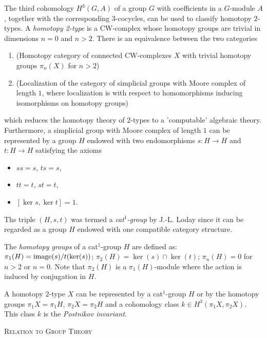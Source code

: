 \documentclass[a4paper,11pt]{report}
\begin{document}
{{ The third cohomology $H^3(G,A)$ of a group $G$ with coefficients in a $G$-module $A$, together with the corresponding $3$-cocycles, can be used to classify homotopy $2$-types. A \emph{homotopy 2-type} is a CW-complex whose homotopy groups are trivial in dimensions $n=0$ and $n>2$. There is an equivalence between the two categories 
\begin{enumerate}
\item  (Homotopy category of connected CW-complexes $X$ with trivial homotopy groups $\pi_n(X)$ for $n>2$) 
\item  (Localization of the category of simplicial groups with Moore complex of
length $1$, where localization is with respect to homomorphisms inducing isomorphisms on
homotopy groups) 
\end{enumerate}
 which reduces the homotopy theory of $2$-types to a 'computable' algebraic theory. Furthermore, a simplicial group
with Moore complex of length $1$ can be represented by a group $H$ endowed with two endomorphisms $s\colon H\rightarrow H$ and $t\colon H\rightarrow H$ satisfying the axioms 
\begin{itemize}
\item $ss=s$, $ts=s$,
\item $tt=t$, $st=t$,
\item  $[\ker s, \ker t] = 1$.
\end{itemize}
 Ths triple $(H,s,t)$ was termed a \emph{cat$^1$-group} by J.-L. Loday since it can be regarded as a group $H$ endowed with one compatible category structure. 

The \emph{homotopy groups} of a cat$^1$-group $H$ are defined as: $\pi_1(H) = {\rm image}(s)/t(\ker(s))$; $\pi_2(H)=\ker(s) \cap \ker(t)$; $\pi_n(H)=0$ for $n> 2$ or $n=0$. Note that $\pi_2(H)$ is a $\pi_1(H)$-module where the action is induced by conjugation in $H$. 

A homotopy $2$-type $X$ can be represented by a cat$^1$-group $H$ or by the homotopy groups $\pi_1X=\pi_1H$, $\pi_2X=\pi_2H$ and a cohomology class $k\in H^3(\pi_1X,\pi_2X)$. This class $k$ is the \emph{Postnikov invariant}. 

\textsc{Relation to Group Theory} 

}}
\end{document}
